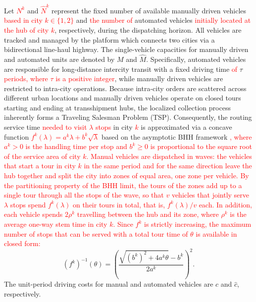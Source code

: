 \documentclass[10pt, reqno]{amsart}
\begin{document}
Let \textcolor{red}{$N^k$} and \textcolor{red}{$\hat{N}^k$} represent the fixed number of available manually driven vehicles \textcolor{red}{based in city $k \in \{1,2\}$} and \textcolor{red}{the number of} automated vehicles \textcolor{red}{initially located at the hub of city $k$}, respectively, during the dispatching horizon. All vehicles are tracked and managed by the platform which connects two cities via a bidirectional line-haul highway. The single-vehicle capacities for manually driven and automated units are denoted by $M$ and $\hat{M}$. Specifically, automated vehicles are responsible for long-distance intercity transit with a fixed driving time \textcolor{red}{of} $\tau$ \textcolor{red}{periods, where $\tau$ is a positive integer}, while manually driven vehicles are restricted to intra-city operations. Because intra-city orders are scattered across different urban locations and manually driven vehicles operate on closed tours starting and ending at transshipment hubs, the localized collection process inherently forms a Traveling Salesman Problem (TSP). Consequently, the routing service time \textcolor{red}{needed to visit $\lambda$ stops} in city \textcolor{red}{$k$} is approximated via a concave function \textcolor{red}{$f^k(\lambda)=a^k\lambda+b^k\sqrt{\lambda}$} based on the asymptotic BHH framework \cite{Beardwood1959Shortest}\textcolor{red}{, where $a^k>0$ is the handling time per stop and $b^k\ge 0$ is proportional to the square root of the service area of city $k$. Manual vehicles are dispatched in waves: the vehicles that start a tour in city $k$ in the same period and for the same direction leave the hub together and split the city into zones of equal area, one zone per vehicle. By the partitioning property of the BHH limit, the tours of the zones add up to a single tour through all the stops of the wave, so that $v$ vehicles that jointly serve $\lambda$ stops spend $f^k(\lambda)$ on their tours in total, that is, $f^k(\lambda)/v$ each. In addition, each vehicle spends $2\rho^k$ travelling between the hub and its zone, where $\rho^k$ is the average one-way stem time in city $k$. Since $f^k$ is strictly increasing, the maximum number of stops that can be served with a total tour time of $\theta$ is available in closed form:}
{\color{red}
\begin{equation}
(f^k)^{-1}(\theta)=\left(\frac{\sqrt{(b^k)^2+4a^k\theta}-b^k}{2a^k}\right)^{2}.\label{eq:bhh inverse}
\end{equation}
}
The unit-period driving costs for manual and automated vehicles are $c$ and $\hat{c}$, respectively.
\end{document}
